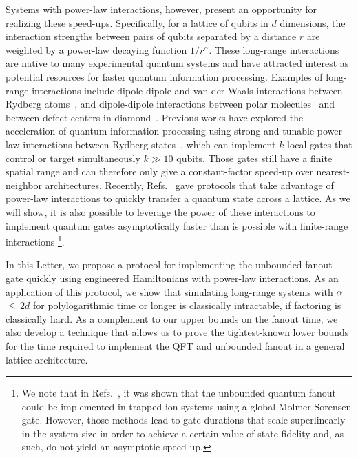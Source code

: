 Systems with power-law interactions, however, present an opportunity for realizing these speed-ups.
Specifically, for a lattice of qubits in $d$ dimensions, the interaction strengths between pairs of qubits separated by a distance $r$ are weighted by a power-law decaying function $1/r^\alpha$.
These long-range interactions are native to many experimental quantum systems and have attracted interest as potential resources for faster quantum information processing. Examples of long-range interactions include dipole-dipole and van der Waals interactions between Rydberg atoms~\cite{Saffman2010,Weimer2012}, and dipole-dipole interactions between polar molecules~\cite{Yan2013} and between defect centers in diamond~\cite{Yao2012,Weimer2012}.
Previous works have explored the acceleration of quantum information processing using strong and tunable power-law interactions between Rydberg states~\cite{Isenhower2011,Molmer2011,Petrosyan2017,Gulliksen2015,Muller2009,Young2020,Levine2019}, which can implement $k$-local gates that control or target simultaneously $k \gg 10$ qubits.
Those gates still have a finite spatial range and can therefore only give a constant-factor speed-up over nearest-neighbor architectures.
Recently, Refs.~\cite{Eldredge2017,Guo2020,Tran2020hierarchylinearlightcones,kuwaharaStrictlyLinearLight2020} gave protocols that take advantage of power-law interactions to quickly transfer a quantum state across a lattice.
As we will show, it is also possible to leverage the power of these interactions to implement quantum gates asymptotically faster than is possible with finite-range interactions \footnote{We note that in Refs.~\cite{Maslov2018,Lu2019}, it was shown that the unbounded quantum fanout could be implemented in trapped-ion systems using a global Molmer-Sorensen gate.
    However, those methods lead to gate durations that scale superlinearly in the system size in order to achieve a certain value of state fidelity and, as such, do not yield an asymptotic speed-up.}.

In this Letter, we propose a protocol for implementing the unbounded fanout gate quickly using engineered Hamiltonians with power-law interactions.
As an application of this protocol, we show that simulating long-range systems with $\alpha$\,$\le$\,$2d$ for polylogarithmic time or longer is classically intractable, if factoring is classically hard.
As a complement to our upper bounds on the fanout time, we also develop a technique that allows us to prove the tightest-known lower bounds for the time required to implement the QFT and unbounded fanout in a general lattice architecture.

